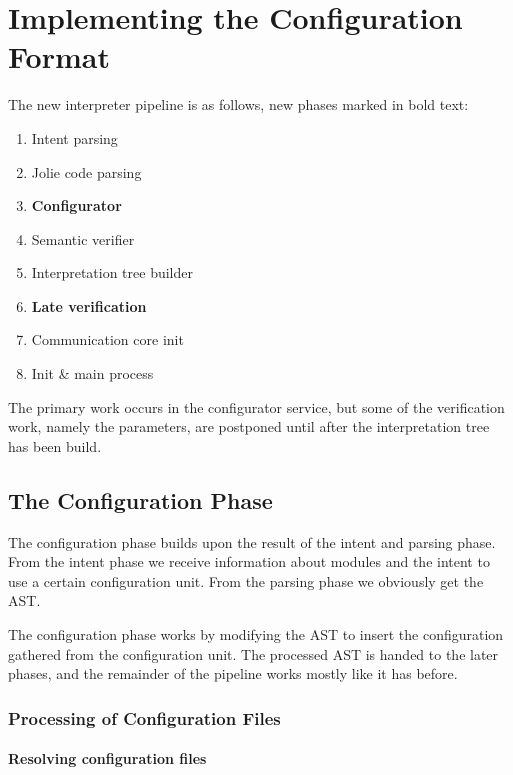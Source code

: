 \section{Implementing the Configuration Format}
\label{sec:col_impl}

The new interpreter pipeline is as follows, new phases marked in bold text:

\begin{enumerate}
\item Intent parsing
\item Jolie code parsing
\item \textbf{Configurator}
\item Semantic verifier
\item Interpretation tree builder
\item \textbf{Late verification}
\item Communication core init
\item Init \& main process
\end{enumerate}

The primary work occurs in the configurator service, but some of the
verification work, namely the parameters, are postponed until after the
interpretation tree has been build.

\subsection{The Configuration Phase}

The configuration phase builds upon the result of the intent and parsing phase.
From the intent phase we receive information about modules and the intent to
use a certain configuration unit. From the parsing phase we obviously get the
AST.

The configuration phase works by modifying the AST to insert the configuration
gathered from the configuration unit. The processed AST is handed to the later
phases, and the remainder of the pipeline works mostly like it has before.

\subsubsection*{Processing of Configuration Files}

\paragraph{Resolving configuration files}

